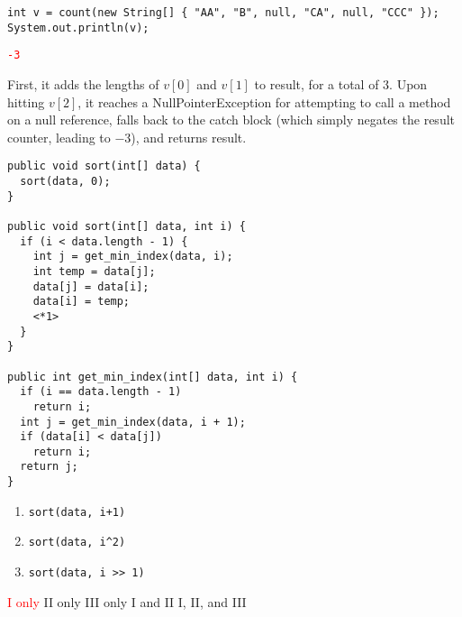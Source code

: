 \documentclass[11pt,addpoints]{exam}
\begin{document}
\begin{questions}
\begin{minipage}{\textwidth}
\begin{verbatim}
int v = count(new String[] { "AA", "B", null, "CA", null, "CCC" });
System.out.println(v);

\end{verbatim}

\begin{choices}
  \choice \textcolor{red}{\tt -3}
   \\
\end{choices}
\end{minipage}

First, it adds the lengths of $v[0]$ and $v[1]$ to result, for a total of 3. Upon hitting $v[2]$, it reaches a NullPointerException for attempting to call a method on a null reference, falls back to the catch block (which simply negates the result counter, leading to $-3$), and returns result.

\begin{minipage}{\textwidth}


\begin{verbatim}
public void sort(int[] data) {
  sort(data, 0);
}

public void sort(int[] data, int i) {
  if (i < data.length - 1) {
    int j = get_min_index(data, i);
    int temp = data[j];
    data[j] = data[i];
    data[i] = temp;
    <*1>
  }
}

public int get_min_index(int[] data, int i) {
  if (i == data.length - 1)
    return i;
  int j = get_min_index(data, i + 1);
  if (data[i] < data[j])
    return i;
  return j;
}
\end{verbatim}

\begin{enumerate}[label=\Roman*.]
  \item {\tt sort(data, i+1)}
  \item {\tt sort(data, i\textasciicircum2)}
  \item {\tt sort(data, i >> 1)} \\
\end{enumerate}

\begin{choices}
  \choice \textcolor{red}{I only}
  \choice II only
  \choice III only
  \choice I and II
  \choice I, II, and III \\
\end{choices}


\end{minipage}
\end{questions}
\end{document}
